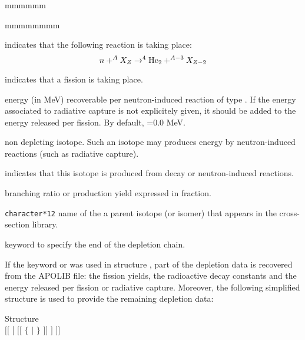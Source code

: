 \begin{ListeDeDescription}{mmmmmm}
\begin{ListeDeDescription}{mmmmmmmm}
\item[\moc{NA}] indicates that the following reaction is taking place:
$$ n +^{A}X_Z \to ^4{\rm He}_2 + ^{A-3}X_{Z-2}$$

\item[\moc{NFTOT}] indicates that a fission is taking place.
\end{ListeDeDescription}

\item[\dusa{energy}] energy (in MeV) recoverable per neutron-induced
reaction of type . If the energy associated to radiative capture
is not explicitely given, it should be added to the energy released per fission. By
default, =0.0 MeV.

\item[\moc{STABLE}] non depleting isotope. Such an isotope may produces
energy by neutron-induced reactions (such as radiative capture).

\item[\moc{FROM}] indicates that this isotope is produced from decay or
neutron-induced reactions.

\item[\dusa{yield}] branching ratio or production yield expressed in fraction.

\item[\dusa{NAMPAR}] {\tt character*12} name of the a parent isotope
(or isomer) that appears in the cross-section library.

\item[\moc{ENDCHAIN}] keyword to specify the end of the depletion chain.

\end{ListeDeDescription}

\vskip 0.15cm

If the keyword  or  was used in structure , part of the
depletion data is recovered from the APOLIB file: the fission yields, the
radioactive decay constants and the energy released per fission or radiative
capture. Moreover, the following simplified structure is used to provide the
remaining depletion data:

\begin{DataStructure}{Structure }
 \\
$[[$  $[$  $[[$ $\{$  $|$  $\}$
  $]]$ $]$ $]]$\\
\end{DataStructure}

